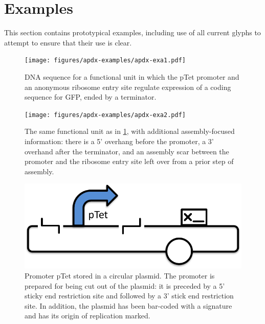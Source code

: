 \section{Examples}\label{sec:examples}


This section contains prototypical examples, including use of all
current glyphs to attempt to ensure that their use is clear.

\begin{figure}[h!]
\texttt{[image: figures/apdx-examples/apdx-exa1.pdf]}
\caption{DNA sequence for a functional unit in which the pTet promoter and an anonymous ribosome entry site regulate expression of a coding sequence for GFP, ended by a terminator.}
\label{f:apdx:exa1}
\end{figure}

\begin{figure}[h!]
\texttt{[image: figures/apdx-examples/apdx-exa2.pdf]}
\caption{The same functional unit as in \ref{f:apdx:exa1}, with additional assembly-focused information: there is a 5' overhang before the promoter, a 3' overhand after the terminator, and an assembly scar between the promoter and the ribosome entry site left over from a prior step of assembly.}
\label{f:apdx:exa2}
\end{figure}

\begin{figure}[h!]
\includegraphics[scale=0.5]{figures/apdx-examples/apdx-exa3.pdf}
\caption{Promoter pTet stored in a circular plasmid. The promoter is prepared for being cut out of the plasmid: it is preceded by a 5' sticky end restriction site and followed by a 3' stick end restriction site.  In addition, the plasmid has been bar-coded with a signature and has its origin of replication marked.}
\label{f:apdx:exa3}
\end{figure}

